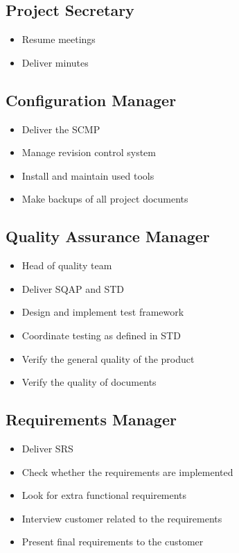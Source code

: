 \documentclass[a4paper, 12pt]{report}
\begin{document}
		\subsection{Project Secretary}
			\begin{itemize}
				\item Resume meetings
				\item Deliver minutes
			\end{itemize}
			
		\subsection{Configuration Manager}
			\begin{itemize}
				\item Deliver the SCMP
				\item Manage revision control system
				\item Install and maintain used tools
				\item Make backups of all project documents
			\end{itemize}
			
		\subsection{Quality Assurance Manager}
			\begin{itemize}
					\item Head of quality team
					\item Deliver SQAP and STD
					\item Design and implement test framework
					\item Coordinate testing as defined in STD
					\item Verify the general quality of the product
					\item Verify the quality of documents
			\end{itemize}
			
		\subsection{Requirements Manager}
			\begin{itemize}
				\item Deliver SRS
				\item Check whether the requirements are implemented
				\item Look for extra functional requirements
				\item Interview customer related to the requirements
				\item Present final requirements to the customer
			\end{itemize}
			
\end{document}
